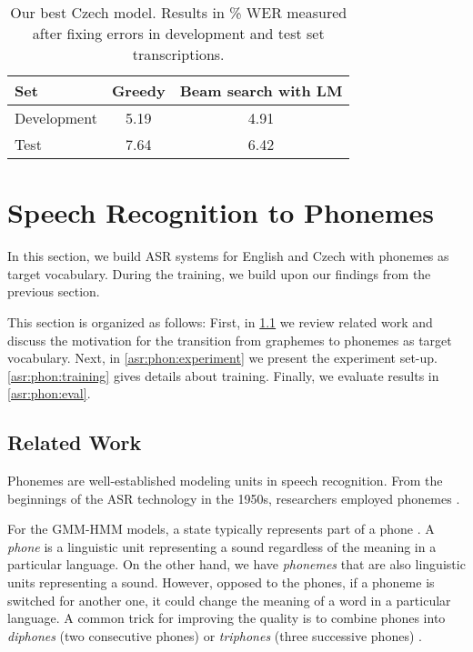 \begin{table}[t]
	\centering
	\begin{tabular}{lcc}
		\bf Set & \bf Greedy & \bf Beam search with LM \\
		\hline
		Development & 5.19 & 4.91 \\
		Test & 7.64 & 6.42 \\
	\end{tabular}
	\caption{Our best Czech model. Results in \% WER measured after fixing errors in development and test set transcriptions.}
	\label{tab:results_rerun}
\end{table}

\pagebreak


\section{Speech Recognition to Phonemes}
\label{asr:transfer_phonemes}
In this section, we build ASR systems for English and Czech with phonemes as target vocabulary. During the training, we build upon our findings from the previous section.

This section is organized as follows: First, in \cref{asr:phon:related} we review related work and discuss the motivation for the transition from graphemes to phonemes as target vocabulary. Next, in \cref{asr:phon:experiment} we present the experiment set-up. \cref{asr:phon:training} gives details about training. Finally, we evaluate results in \cref{asr:phon:eval}.

\subsection{Related Work}
\label{asr:phon:related}

Phonemes are well-established modeling units in speech recognition. From the beginnings of the ASR technology in the 1950s, researchers employed phonemes . 

For the GMM-HMM models, a state typically represents part of a phone . A \emph{phone} is a linguistic unit representing a sound regardless of the meaning in a particular language. On the other hand, we have \emph{phonemes} that are also linguistic units representing a sound. However, opposed to the phones, if a phoneme is switched for another one, it could change the meaning of a word in a particular language. A common trick for improving the quality is to combine phones into \emph{diphones} (two consecutive phones) or \emph{triphones} (three successive phones) .  

